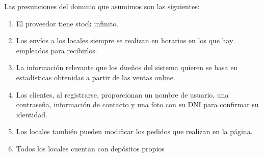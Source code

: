 Las presunciones del dominio que asumimos son las siguientes:
\begin{enumerate}
\item El proveedor tiene stock infinito.
\item Los envíos a los locales siempre se realizan en horarios en los que hay empleados para recibirlos.
\item La información relevante que los dueños del sistema quieren se basa en estadísticas obtenidas a partir de las ventas online.
\item Los clientes, al registrarse, proporcionan un nombre de usuario, una contraseña, información de contacto y una foto con su DNI para confirmar su identidad.
\item Los locales también pueden modificar los pedidos que realizan en la página.

\item Todos los locales cuentan con dep\'ositos propios
\end{enumerate}
